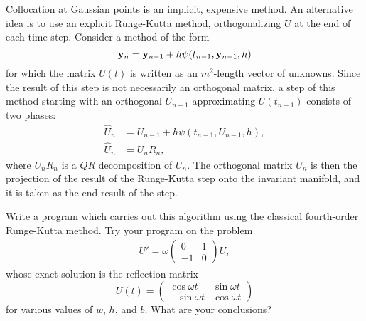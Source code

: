 \begin{problem}[A\&P 4.17]
  Collocation at Gaussian points is an implicit, expensive method. An
alternative idea is to use an explicit Runge-Kutta method, orthogonalizing $U$ at the end of each time step. Consider a method of the form
  \[
    \mathbf{y}_n = \mathbf{y}_{n-1} + h \mathbf{\psi}(t_{n-1}, \mathbf{y}_{n-1}, h)
  \]
  for which the matrix $U(t)$ is written as an $m^2$-length vector of unknowns. Since the result of this step is not necessarily an orthogonal matrix, a step of this method starting with an orthogonal $U_{n-1}$ approximating $U(t_{n-1})$ consists of two phases:
  \begin{align*}
    \hat{U}_n &= U_{n-1} + h \psi(t_{n-1}, U_{n-1}, h), \\
    \hat{U}_n &= U_n R_n,
  \end{align*}
  where $U_n R_n$ is a $QR$ decomposition of $U_n$. The orthogonal matrix $U_n$ is then the projection of the result of the Runge-Kutta step onto the invariant manifold, and it is taken as the end result of the step.
  
  Write a program which carries out this algorithm using the classical fourth-order Runge-Kutta method. Try your program on the problem
  \begin{align*}
    U' = \omega
    \begin{pmatrix}
      0 & 1 \\
      -1 & 0
    \end{pmatrix}
    U,
  \end{align*}
  whose exact solution is the reflection matrix
  \[
    U(t) = 
    \begin{pmatrix}
      \cos \omega t & \sin \omega t \\
      -\sin \omega t & \cos \omega t
    \end{pmatrix}
  \]
  for various values of $w$, $h$, and $b$. What are your conclusions?
\end{problem}

\FloatBarrier

\begin{solution}
  
\end{solution}